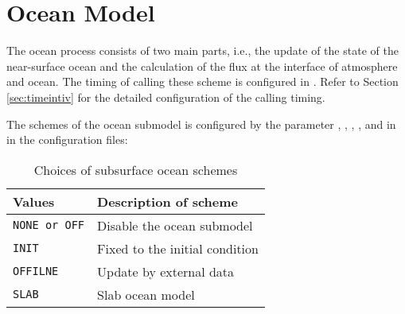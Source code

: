 \section{Ocean Model} \label{sec:basic_usel_ocean}
The ocean process consists of two main parts, i.e., the update of the state of the near-surface ocean and the calculation of the flux at the interface of atmosphere and ocean.
The timing of calling these scheme is configured in . Refer to Section \ref{sec:timeintiv} for the detailed configuration of the calling timing.

The schemes of the ocean submodel is configured by the parameter , , , , and  in  in the configuration files:


\begin{table}[h]
\begin{center}
  \caption{Choices of subsurface ocean schemes}
  \label{tab:nml_ocean_dyn}
  \begin{tabularx}{150mm}{lX} \hline
    \rowcolor[gray]{0.9}  Values & Description of scheme \\ \hline
      \verb|NONE or OFF| & Disable the ocean submodel \\
      \verb|INIT|        & Fixed to the initial condition \\
      \verb|OFFILNE|     & Update by external data \\
      \verb|SLAB|        & Slab ocean model \\
    \hline
  \end{tabularx}
\end{center}
\end{table}

